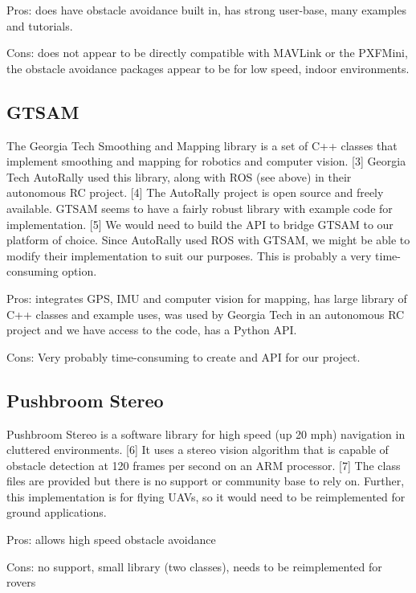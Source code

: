 \documentclass[compsoc,draftclsnofoot,onecolumn,10pt]{IEEEtran}
\begin{document}
Pros: does have obstacle avoidance built in, has strong user-base, many examples
and tutorials.

Cons: does not appear to be directly compatible with MAVLink or the PXFMini, the
obstacle avoidance packages appear to be for low speed, indoor environments.

\subsection{GTSAM}
The Georgia Tech Smoothing and Mapping library is a set of C++ classes that
implement smoothing and mapping for robotics and computer vision. [3] Georgia
Tech AutoRally used this library, along with ROS (see above) in their autonomous RC
project. [4] The AutoRally project is open source and freely available. GTSAM
seems to have a fairly robust library with example code for implementation. [5]
We would need to build the API to bridge GTSAM to our platform of choice. Since
AutoRally used ROS with GTSAM, we might be able to modify their implementation
to suit our purposes. This is probably a very time-consuming option.

Pros: integrates GPS, IMU and computer vision for mapping, has large library of
C++ classes and example uses, was used by Georgia Tech in an autonomous RC
project and we have access to the code, has a Python API.

Cons: Very probably time-consuming to create and API for our project.

\subsection{Pushbroom Stereo}
Pushbroom Stereo is a software library for high speed (up 20 mph) navigation in
cluttered environments. [6] It uses a stereo vision algorithm that is capable of
obstacle detection at 120 frames per second on an ARM processor. [7] The class
files are provided but there is no support or community base to rely on.
Further, this implementation is for flying UAVs, so it would need to be
reimplemented for ground applications.

Pros: allows high speed obstacle avoidance

Cons: no support, small library (two classes), needs to be reimplemented for
rovers
\end{document}
